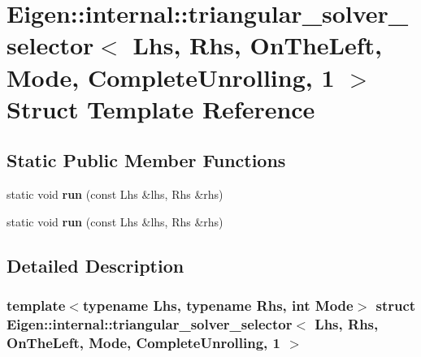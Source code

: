\hypertarget{struct_eigen_1_1internal_1_1triangular__solver__selector_3_01_lhs_00_01_rhs_00_01_on_the_left_00d738951dca8e27ae91ede40ea882f73c}{}\section{Eigen\+:\+:internal\+:\+:triangular\+\_\+solver\+\_\+selector$<$ Lhs, Rhs, On\+The\+Left, Mode, Complete\+Unrolling, 1 $>$ Struct Template Reference}
\label{struct_eigen_1_1internal_1_1triangular__solver__selector_3_01_lhs_00_01_rhs_00_01_on_the_left_00d738951dca8e27ae91ede40ea882f73c}
\subsection*{Static Public Member Functions}
\begin{DoxyCompactItemize}
\item 
\mbox{\label{struct_eigen_1_1internal_1_1triangular__solver__selector_3_01_lhs_00_01_rhs_00_01_on_the_left_00d738951dca8e27ae91ede40ea882f73c_a771e7542b3f8ed0a55978e7524624655}} 
static void {\bfseries run} (const Lhs \&lhs, Rhs \&rhs)
\item 
\mbox{\label{struct_eigen_1_1internal_1_1triangular__solver__selector_3_01_lhs_00_01_rhs_00_01_on_the_left_00d738951dca8e27ae91ede40ea882f73c_a771e7542b3f8ed0a55978e7524624655}} 
static void {\bfseries run} (const Lhs \&lhs, Rhs \&rhs)
\end{DoxyCompactItemize}


\subsection{Detailed Description}
\subsubsection*{template$<$typename Lhs, typename Rhs, int Mode$>$\newline
struct Eigen\+::internal\+::triangular\+\_\+solver\+\_\+selector$<$ Lhs, Rhs, On\+The\+Left, Mode, Complete\+Unrolling, 1 $>$}



